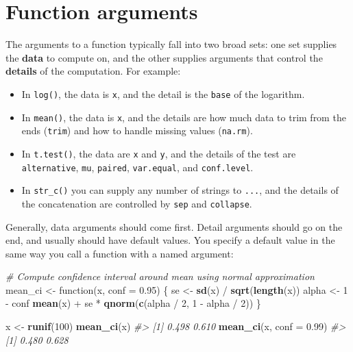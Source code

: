 \documentclass[]{book}
\newenvironment{Shaded}{\begin{snugshade}}{\end{snugshade}}
\newcommand{\KeywordTok}[1]{\textcolor[rgb]{0.13,0.29,0.53}{\textbf{{#1}}}}
\newcommand{\DataTypeTok}[1]{\textcolor[rgb]{0.13,0.29,0.53}{{#1}}}
\newcommand{\DecValTok}[1]{\textcolor[rgb]{0.00,0.00,0.81}{{#1}}}
\newcommand{\FloatTok}[1]{\textcolor[rgb]{0.00,0.00,0.81}{{#1}}}
\newcommand{\StringTok}[1]{\textcolor[rgb]{0.31,0.60,0.02}{{#1}}}
\newcommand{\CommentTok}[1]{\textcolor[rgb]{0.56,0.35,0.01}{\textit{{#1}}}}
\newcommand{\NormalTok}[1]{{#1}}
\begin{document}
\section{Function arguments}\label{function-arguments}

The arguments to a function typically fall into two broad sets: one set
supplies the \textbf{data} to compute on, and the other supplies
arguments that control the \textbf{details} of the computation. For
example:

\begin{itemize}
\item
  In \texttt{log()}, the data is \texttt{x}, and the detail is the
  \texttt{base} of the logarithm.
\item
  In \texttt{mean()}, the data is \texttt{x}, and the details are how
  much data to trim from the ends (\texttt{trim}) and how to handle
  missing values (\texttt{na.rm}).
\item
  In \texttt{t.test()}, the data are \texttt{x} and \texttt{y}, and the
  details of the test are \texttt{alternative}, \texttt{mu},
  \texttt{paired}, \texttt{var.equal}, and \texttt{conf.level}.
\item
  In \texttt{str\_c()} you can supply any number of strings to
  \texttt{...}, and the details of the concatenation are controlled by
  \texttt{sep} and \texttt{collapse}.
\end{itemize}

Generally, data arguments should come first. Detail arguments should go
on the end, and usually should have default values. You specify a
default value in the same way you call a function with a named argument:

\begin{Shaded}
\begin{Highlighting}[]
\CommentTok{# Compute confidence interval around mean using normal approximation}
\NormalTok{mean_ci <-}\StringTok{ }\NormalTok{function(x, }\DataTypeTok{conf =} \FloatTok{0.95}\NormalTok{) \{}
  \NormalTok{se <-}\StringTok{ }\KeywordTok{sd}\NormalTok{(x) /}\StringTok{ }\KeywordTok{sqrt}\NormalTok{(}\KeywordTok{length}\NormalTok{(x))}
  \NormalTok{alpha <-}\StringTok{ }\DecValTok{1} \NormalTok{-}\StringTok{ }\NormalTok{conf}
  \KeywordTok{mean}\NormalTok{(x) +}\StringTok{ }\NormalTok{se *}\StringTok{ }\KeywordTok{qnorm}\NormalTok{(}\KeywordTok{c}\NormalTok{(alpha /}\StringTok{ }\DecValTok{2}\NormalTok{, }\DecValTok{1} \NormalTok{-}\StringTok{ }\NormalTok{alpha /}\StringTok{ }\DecValTok{2}\NormalTok{))}
\NormalTok{\}}

\NormalTok{x <-}\StringTok{ }\KeywordTok{runif}\NormalTok{(}\DecValTok{100}\NormalTok{)}
\KeywordTok{mean_ci}\NormalTok{(x)}
\CommentTok{#> [1] 0.498 0.610}
\KeywordTok{mean_ci}\NormalTok{(x, }\DataTypeTok{conf =} \FloatTok{0.99}\NormalTok{)}
\CommentTok{#> [1] 0.480 0.628}
\end{Highlighting}
\end{Shaded}
\end{document}
